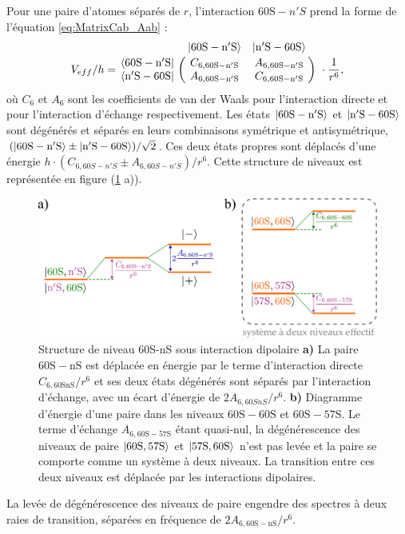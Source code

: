 Pour une paire d'atomes séparés de $r$, l'interaction $\mathrm{60S}-n'S$ prend la forme de l'équation \eqref{eq:MatrixCab_Aab} :
\begin{equation}
\label{eq:Matrix_60SnS}
V_{eff}/h = \bordermatrix{~ 	&\ket{\mathrm{60S-n'S}} 	& \ket{\mathrm{n'S-60S}} \cr
	\bra{\mathrm{60S-n'S}}		&C_{6,\mathrm{60S-n'S}}		&A_{6,\mathrm{60S-n'S}}	\cr 
	\bra{\mathrm{n'S-60S}} 		&A_{6,\mathrm{60S-n'S}}		&C_{6,\mathrm{60S-n'S}} \cr} \ \cdot \frac{1}{r^6},
\end{equation}
%
où $C_6$ et $A_6$ sont les coefficients de van der Waals pour l'interaction directe et pour l'interaction d'échange respectivement.
Les états $\ket{\mathrm{60S-n'S}}$ et $\ket{\mathrm{n'S-60S}}$ sont dégénérés et séparés en leurs combinaisons symétrique et antisymétrique, $(\ket{\mathrm{60S-n'S}}\pm\ket{\mathrm{n'S-60S}})/\sqrt{2}$.
Ces deux états propres sont déplacés d'une énergie $h\cdot (C_{6,60S-n'S} \pm A_{6,60S-n'S}) / r^6$.
Cette structure de niveaux est représentée en figure (\ref{fig:60S-nS} a)).
%
\begin{figure}[h]
\centering
\includegraphics[width=\linewidth]{figures/low_l/60S-nS}
\caption[Structure de niveau 60S-nS sous interaction dipolaire]{
Structure de niveau 60S-nS sous interaction dipolaire
\textbf{a)} La paire $\mathrm{60S-nS}$ est déplacée en énergie par le terme d'interaction directe $C_{6,\mathrm{60SnS}}/r^6$ et ses deux états dégénérés sont séparés par l'interaction d'échange, avec un écart d'énergie de $2A_{6,60SnS}/r^6$.
\textbf{b)} Diagramme d'énergie d'une paire dans les niveaux $\mathrm{60S-60S}$ et $\mathrm{60S-57S}$.
Le terme d'échange $A_{6,\mathrm{60S-57S}}$ étant quasi-nul, la dégénérescence des niveaux de paire $\ket{\mathrm{60S,57S}}$ et $\ket{\mathrm{57S,60S}}$ n'est pas levée et la paire se comporte comme un système à deux niveaux.
La transition entre ces deux niveaux est déplacée par les interactions dipolaires.
}
\label{fig:60S-nS}
\end{figure}
%
La levée de dégénérescence des niveaux de paire engendre des spectres à deux raies de transition, séparées en fréquence de $2A_{6,\mathrm{60S-nS}}/r^6$.
